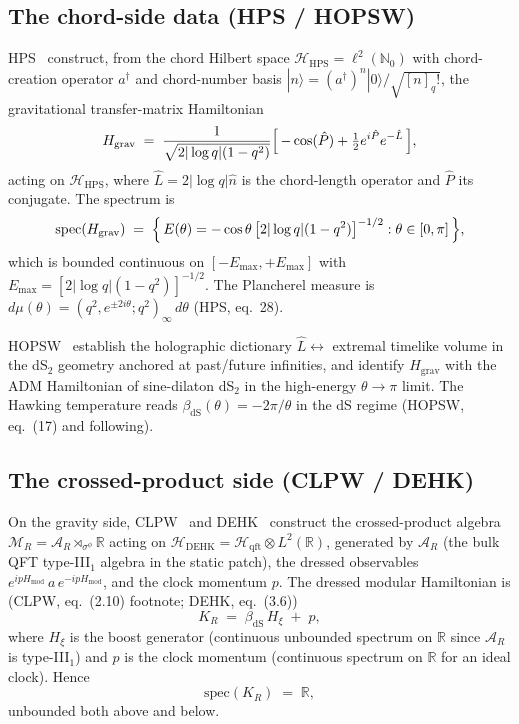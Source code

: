 \documentclass[12pt,a4paper]{article}
\theoremstyle{definition}
\begin{document}
\subsection{The chord-side data (HPS / HOPSW)}
HPS~\cite{HPS2024} construct, from the chord Hilbert space
$\mathcal{H}_{\mathrm{HPS}}=\ell^2(\mathbb{N}_0)$ with chord-creation
operator $a^\dagger$ and chord-number basis $|n\rangle =
(a^\dagger)^n|0\rangle/\sqrt{[n]_{q}!}$, the gravitational transfer-matrix
Hamiltonian
\begin{equation}
   H_{\mathrm{grav}}
   \;=\; \frac{1}{\sqrt{2|\log q|(1-q^2)}}
         \Bigl[\,-\cos(\hat P) + \tfrac12 e^{i\hat P}e^{-\hat L}\,\Bigr] ,
   \label{eq:Hgrav}
\end{equation}
acting on $\mathcal{H}_{\mathrm{HPS}}$, where $\hat L = 2|\log q|\hat n$
is the chord-length operator and $\hat P$ its conjugate. The spectrum is
\begin{equation}
   \mathrm{spec}(H_{\mathrm{grav}})
   \;=\; \Bigl\{\,E(\theta)=-\cos\theta\,\bigl[2|\log q|(1-q^2)\bigr]^{-1/2}
                : \theta\in[0,\pi]\,\Bigr\} ,
   \label{eq:HPS-spec}
\end{equation}
which is bounded continuous on $[-E_{\max},+E_{\max}]$ with
$E_{\max} = [2|\log q|(1-q^2)]^{-1/2}$. The Plancherel measure is
$d\mu(\theta) = (q^2,e^{\pm 2i\theta};q^2)_\infty\,d\theta$ (HPS, eq.~28).

HOPSW~\cite{HOPSW2025} establish the holographic dictionary
$\hat L \leftrightarrow$ extremal timelike volume in the dS$_2$ geometry
anchored at past/future infinities, and identify $H_{\mathrm{grav}}$ with
the ADM Hamiltonian of sine-dilaton dS$_2$ in the high-energy
$\theta\to\pi$ limit. The Hawking temperature reads
$\beta_{\mathrm{dS}}(\theta) = -2\pi/\theta$ in the dS regime
(HOPSW, eq.~(17) and following).

\subsection{The crossed-product side (CLPW / DEHK)}
On the gravity side, CLPW~\cite{CLPW2023} and DEHK~\cite{DEHK2025a}
construct the crossed-product algebra
$\mathcal{M}_R = \mathcal{A}_R\rtimes_{\sigma^\phi}\mathbb{R}$ acting on
$\mathcal{H}_{\mathrm{DEHK}} = \mathcal{H}_{\mathrm{qft}}\otimes L^2(\mathbb{R})$,
generated by $\mathcal{A}_R$ (the bulk QFT type-III$_1$ algebra in the
static patch), the dressed observables
$e^{i pH_{\mathrm{mod}}}\,a\,e^{-ipH_{\mathrm{mod}}}$, and the clock
momentum $p$. The dressed modular Hamiltonian is (CLPW, eq.~(2.10)
footnote; DEHK, eq.~(3.6))
\begin{equation}
   K_R \;=\; \beta_{\mathrm{dS}}\,H_\xi \;+\; p ,
   \label{eq:KR}
\end{equation}
where $H_\xi$ is the boost generator (continuous unbounded spectrum on
$\mathbb{R}$ since $\mathcal{A}_R$ is type-III$_1$) and $p$ is the clock
momentum (continuous spectrum on $\mathbb{R}$ for an ideal clock). Hence
\begin{equation}
   \mathrm{spec}(K_R) \;=\; \mathbb{R} ,
\end{equation}
unbounded both above and below.
\end{document}
